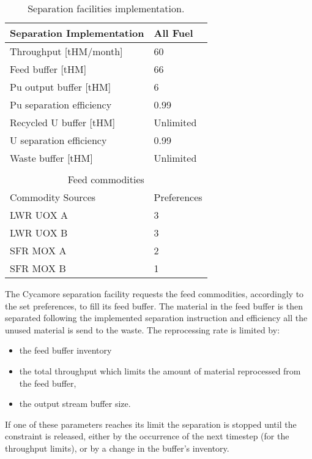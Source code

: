 \documentclass[12pt]{article}
\begin{document}
\begin{table}[h!]
    \centering
    \begin{tabular}{ll}
    \hline
    Separation Implementation  &  All Fuel   \\
    \hline
    Throughput [tHM/month]     &  60         \\
    Feed buffer [tHM]          &  66         \\
    Pu output buffer  [tHM]    &  6          \\
    Pu separation efficiency   &  0.99       \\
    Recycled U buffer [tHM]    &  Unlimited  \\
    U separation efficiency    &  0.99       \\
    Waste buffer [tHM]         &  Unlimited  \\ 
                                             \\
    \multicolumn{2}{c}{Feed commodities}    \\
    \hline
    Commodity Sources         &  Preferences \\
    LWR UOX A                 &  3           \\
    LWR UOX B                 &  3           \\
    SFR MOX A                 &  2           \\
    SFR MOX B                 &  1           \\ 
    \hline
    \end{tabular}
    \caption{Separation facilities implementation.}
    \label{tab:fuelfab_2}
\end{table}

The Cycamore separation facility requests the feed commodities, accordingly to the
set preferences, to fill its feed buffer. The material in the feed buffer is then
separated following the implemented separation instruction and efficiency all the
unused material is send to the waste. The reprocessing rate is limited by:

\begin{itemize}

  \item the feed buffer inventory
  \item the total throughput which limits the amount of material reprocessed from
    the feed buffer,
  \item the output stream buffer size.

\end{itemize}
If one of these parameters reaches its limit the separation is stopped until the
constraint is released, either by the occurrence of the next timestep (for the
throughput limits), or by a change in the buffer's inventory. 
\end{document}
